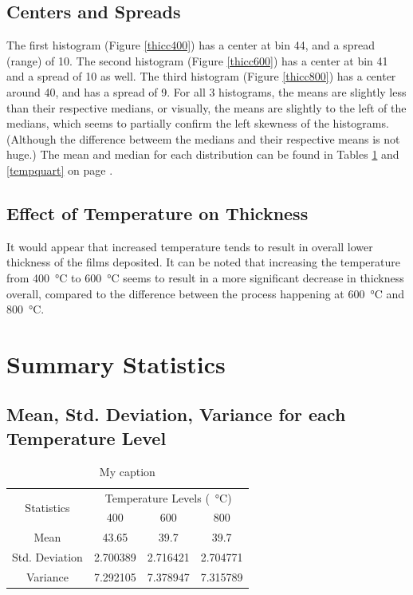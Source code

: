 \documentclass[letterpaper]{article}
\begin{document}
\subsection{Centers and Spreads}
The first histogram (Figure \ref{thicc400}) has a center at bin 44, and a spread
(range) of 10. The second histogram (Figure \ref{thicc600}) has a center at bin
41 and a spread of 10 as well. The third histogram (Figure \ref{thicc800}) has a
center around 40, and has a spread of 9. For all 3 histograms, the means are
slightly less than their respective medians, or visually, the means are slightly
to the left of the medians, which seems to partially confirm the left skewness
of the histograms. (Although the difference betweem the medians and their
respective means is not huge.) The mean and median for each distribution can be
found in Tables \ref{tempmean} and \ref{tempquart} on page \pageref{tempmean}.


\subsection{Effect of Temperature on Thickness}
It would appear that increased temperature tends to result in overall lower
thickness of the films deposited. It can be noted that increasing the
temperature from \SI{400}{\celsius} to \SI{600}{\celsius} seems to result in a
more significant decrease in thickness overall, compared to the difference
between the process happening at \SI{600}{\celsius} and \SI{800}{\celsius}.

\section{Summary Statistics}

\subsection{Mean, Std. Deviation, Variance for each Temperature Level}

\begin{table}[H]
 \centering
 \begin{tabular}{c|c|c|c|}
  \multirow{2}{*}{Statistics} & \multicolumn{3}{c|}{Temperature Levels (\SI{}{\celsius})}                       \\ \cline{2-4}
                              & 400                                                       & 600      & 800      \\ \hline
  Mean                        & 43.65                                                     & 39.7     & 39.7     \\ \hline
  Std. Deviation              & 2.700389                                                  & 2.716421 & 2.704771 \\ \hline
  Variance                    & 7.292105                                                  & 7.378947 & 7.315789 \\ \hline
 \end{tabular}
 \caption{My caption}
 \label{tempmean}
\end{table}
\end{document}
